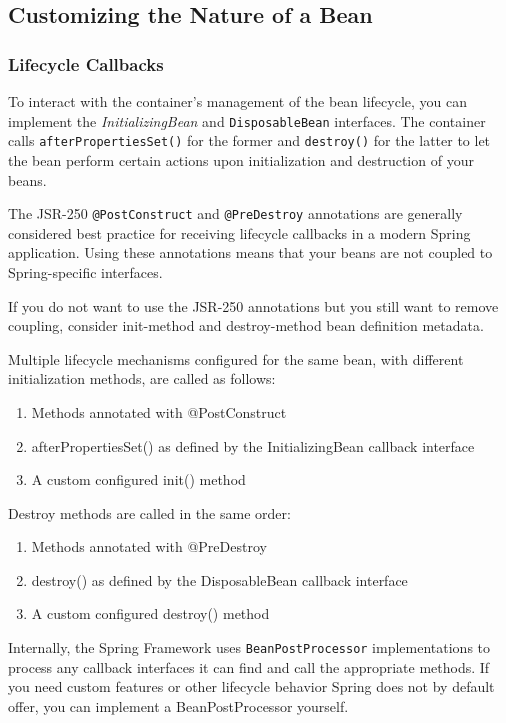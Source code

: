 \documentclass{scrartcl}
\begin{document}
\subsection{Customizing the Nature of a Bean}
\subsubsection{Lifecycle Callbacks}

To interact with the container’s management of the bean lifecycle, you can implement the \textit{InitializingBean}
\lstinline|| and \lstinline|DisposableBean| interfaces. The container calls \lstinline|afterPropertiesSet()| for the
former and \lstinline|destroy()| for the latter to let the bean perform certain actions upon initialization and
destruction of your beans.

The JSR-250 \lstinline|@PostConstruct| and \lstinline|@PreDestroy| annotations are generally considered
best practice for receiving lifecycle callbacks in a modern Spring application. Using these annotations means that your beans are not coupled to Spring-specific
interfaces.

If you do not want to use the JSR-250 annotations but you still want to remove
coupling, consider init-method and destroy-method bean definition metadata.

Multiple lifecycle mechanisms configured for the same bean, with different initialization methods,
are called as follows:

\begin{enumerate}
    \item Methods annotated with @PostConstruct
    \item afterPropertiesSet() as defined by the InitializingBean callback interface
    \item A custom configured init() method
\end{enumerate}

Destroy methods are called in the same order:

\begin{enumerate}
    \item Methods annotated with @PreDestroy
    \item destroy() as defined by the DisposableBean callback interface
    \item A custom configured destroy() method
\end{enumerate}

Internally, the Spring Framework uses \lstinline|BeanPostProcessor| implementations to process any callback
interfaces it can find and call the appropriate methods. If you need custom features or other
lifecycle behavior Spring does not by default offer, you can implement a BeanPostProcessor yourself.
\end{document}
